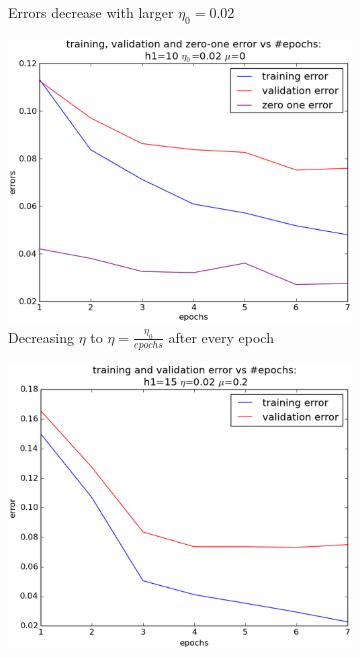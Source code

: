 \begin{itemize}
\begin{figure}[!ht]
\begin{subfigure}[b]{.45\textwidth}
		\caption{Errors decrease with larger $\eta_0=0.02$}
		\label{fig:larger_eta}
		\end{subfigure}
		\begin{subfigure}[b]{.45\textwidth}
		\centering
		\includegraphics[width=\textwidth]{mlp/plots/effects/larger_eta_decrease.eps}
		\caption{Decreasing $\eta$ to $\eta=\frac{\eta_0}{epochs}$ after every epoch}
		\label{fig:decrease_eta}
		\end{subfigure}
		\quad
		\begin{subfigure}[b]{.45\textwidth}
		\centering
		\includegraphics[width=\textwidth]{mlp/plots/effect_momentum.eps}

\end{subfigure}
\end{figure}
\end{itemize}
